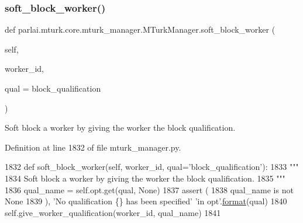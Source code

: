 \mbox{\label{classparlai_1_1mturk_1_1core_1_1mturk__manager_1_1MTurkManager_aa9b385ef48553d3150e195fe82d24c88}} 
\subsubsection{\texorpdfstring{soft\+\_\+block\+\_\+worker()}{soft\_block\_worker()}}
{\footnotesize\ttfamily def parlai.\+mturk.\+core.\+mturk\+\_\+manager.\+M\+Turk\+Manager.\+soft\+\_\+block\+\_\+worker (\begin{DoxyParamCaption}\item[{}]{self,  }\item[{}]{worker\+\_\+id,  }\item[{}]{qual = {\ttfamily \textquotesingle{}block\+\_\+qualification\textquotesingle{}} }\end{DoxyParamCaption})}

\begin{DoxyVerb}Soft block a worker by giving the worker the block qualification.
\end{DoxyVerb}
 

Definition at line 1832 of file mturk\+\_\+manager.\+py.


\begin{DoxyCode}
1832     \textcolor{keyword}{def }soft\_block\_worker(self, worker\_id, qual='block\_qualification'):
1833         \textcolor{stringliteral}{"""}
1834 \textcolor{stringliteral}{        Soft block a worker by giving the worker the block qualification.}
1835 \textcolor{stringliteral}{        """}
1836         qual\_name = self.opt.get(qual, \textcolor{keywordtype}{None})
1837         \textcolor{keyword}{assert} (
1838             qual\_name \textcolor{keywordflow}{is} \textcolor{keywordflow}{not} \textcolor{keywordtype}{None}
1839         ), \textcolor{stringliteral}{'No qualification \{\} has been specified'} \textcolor{stringliteral}{'in opt'}.\hyperlink{namespaceparlai_1_1chat__service_1_1services_1_1messenger_1_1shared__utils_a32e2e2022b824fbaf80c747160b52a76}{format}(qual)
1840         self.give\_worker\_qualification(worker\_id, qual\_name)
1841 
\end{DoxyCode}
\mbox{\label{classparlai_1_1mturk_1_1core_1_1mturk__manager_1_1MTurkManager_a02acff72f25ec7a77edca9489fe3b804}} 
